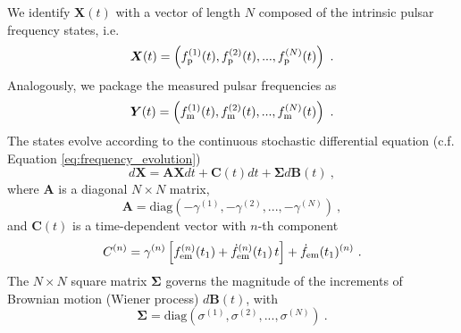 \documentclass[fleqn,usenatbib,useAMS]{mnras}
\begin{document}
We identify $\boldsymbol{X}(t)$ with a vector of length $N$ composed of the intrinsic pulsar frequency states, i.e. 
\begin{equation}
	\boldsymbol{X}(t) = \left(f_{\rm p}^{(1)}(t), f_{\rm p}^{(2)}(t), ..., f_{\rm p}^{(N)}(t)\right) \ .
\end{equation}
Analogously,  we package the measured pulsar frequencies as
\begin{equation}
	\boldsymbol{Y}(t) = \left(f_{\rm m}^{(1)}(t), f_{\rm m}^{(2)}(t), ..., f_{\rm m}^{(N)}(t) \right) \ .
\end{equation}
The states evolve according to the continuous stochastic differential equation (c.f. Equation \eqref{eq:frequency_evolution})
\begin{equation}
	d \boldsymbol{X} = \boldsymbol{A} \boldsymbol{X} dt + \boldsymbol{C}(t) dt + \boldsymbol{\Sigma} d \boldsymbol{B}(t) \ , \label{eq:kalmn2}
\end{equation}
where $\boldsymbol{A}$ is a diagonal $N \times N$ matrix,
\begin{equation}
	\boldsymbol{A} = \text{diag} \left(-\gamma^{(1)}, -\gamma^{(2)}, ..., -\gamma^{(N)}\right) \ ,
\end{equation}
and $\boldsymbol{C}(t)$ is a time-dependent vector with $n$-th component
\begin{equation}
	C^{(n)} =\gamma^{(n)} \left[ f^{(n)} _{\rm em} (t_1) + \dot{f}^{(n)} _{\rm em}(t_1) \, t \right] +  \dot{f}_{\rm em}(t_1)^{(n)} \ .
\end{equation}
The $N \times N$ square matrix $\boldsymbol{\Sigma}$  governs the magnitude of the increments of Brownian motion (Wiener process) $d\boldsymbol{B}(t)$, with
\begin{equation}
	\boldsymbol{\Sigma} = \text{diag} \left(\sigma^{(1)}, \sigma^{(2)}, ..., \sigma^{(N)}\right) \ .
\end{equation}
\end{document}
